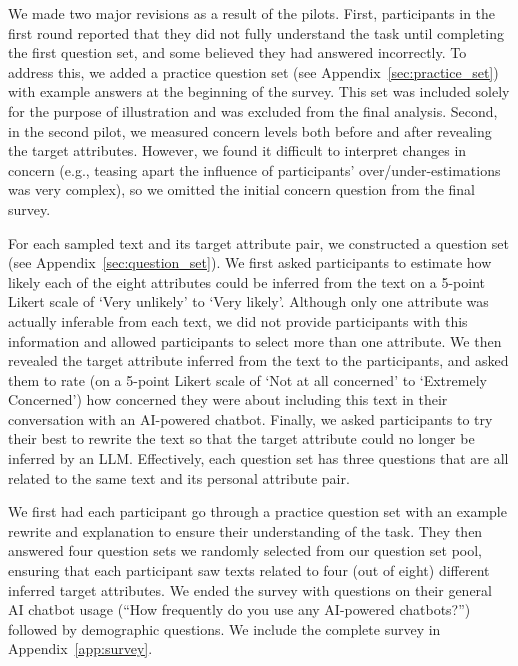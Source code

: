 We made two major revisions as a result of the pilots. First, participants in the first round reported that they did not fully understand the task until completing the first question set, and some believed they had answered incorrectly. To address this, we added a practice question set (see Appendix~\ref{sec:practice_set}) with example answers at the beginning of the survey. This set was included solely for the purpose of illustration and was excluded from the final analysis. Second, in the second pilot, we measured concern levels both before and after revealing the target attributes. However, we found it difficult to interpret changes in concern (e.g., teasing apart the influence of participants' over/under-estimations was very complex), so we omitted the initial concern question from the final survey.

For each sampled text and its target attribute pair, we constructed a question set (see Appendix~\ref{sec:question_set}). We first asked participants to estimate how likely each of the eight attributes could be inferred from the text on a 5-point Likert scale of `Very unlikely' to `Very likely'. Although only one attribute was actually inferable from each text, we did not provide participants with this information and allowed participants to select more than one attribute. We then revealed the target attribute inferred from the text to the participants, and asked them to rate (on a 5-point Likert scale of `Not at all concerned' to `Extremely Concerned') how concerned they were about including this text in their conversation with an AI-powered chatbot. Finally, we asked participants to try their best to rewrite the text so that the target attribute could no longer be inferred by an LLM. Effectively, each question set has three questions that are all related to the same text and its personal attribute pair.

We first had each participant go through a practice question set with an example rewrite and explanation to ensure their understanding of the task. They then answered four question sets we randomly selected from our question set pool, ensuring that each participant saw texts related to four (out of eight) different inferred target attributes. We ended the survey with questions on their general AI chatbot usage (``How frequently do you use any AI-powered chatbots?'')
followed by demographic questions. We include the complete survey in Appendix~\ref{app:survey}.



